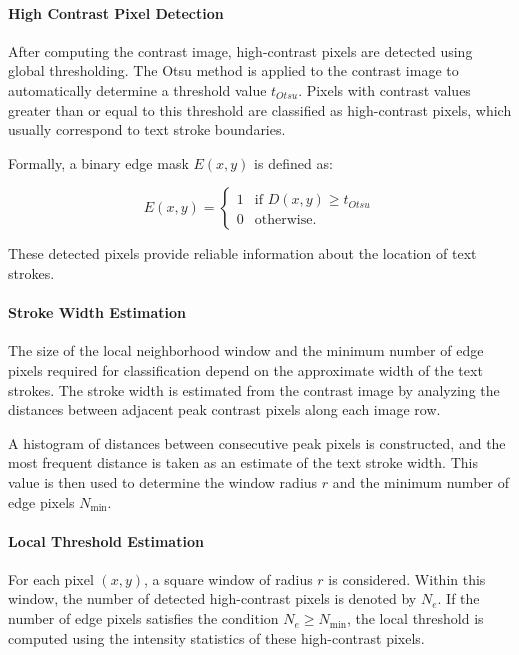 \paragraph{High Contrast Pixel Detection}

After computing the contrast image, high-contrast pixels are detected
using global thresholding. The Otsu method is applied to the contrast
image to automatically determine a threshold value $t_{Otsu}$. Pixels
with contrast values greater than or equal to this threshold are
classified as high-contrast pixels, which usually correspond to text
stroke boundaries.

Formally, a binary edge mask $E(x,y)$ is defined as:

\[
E(x,y) =
\begin{cases}
1 & \text{if } D(x,y) \ge t_{Otsu} \\
0 & \text{otherwise}.
\end{cases}
\]

These detected pixels provide reliable information about the location
of text strokes.

\paragraph{Stroke Width Estimation}

The size of the local neighborhood window and the minimum number of
edge pixels required for classification depend on the approximate
width of the text strokes. The stroke width is estimated from the
contrast image by analyzing the distances between adjacent peak
contrast pixels along each image row.

A histogram of distances between consecutive peak pixels is
constructed, and the most frequent distance is taken as an estimate
of the text stroke width. This value is then used to determine the
window radius $r$ and the minimum number of edge pixels $N_{\min}$.

\paragraph{Local Threshold Estimation}

For each pixel $(x,y)$, a square window of radius $r$ is considered.
Within this window, the number of detected high-contrast pixels is
denoted by $N_e$. If the number of edge pixels satisfies the
condition $N_e \ge N_{\min}$, the local threshold is computed using
the intensity statistics of these high-contrast pixels.

